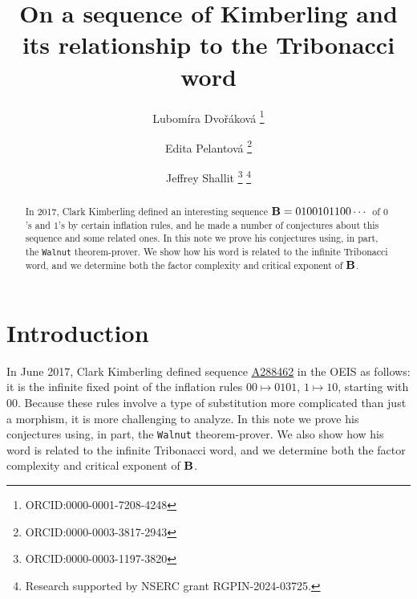 \documentclass[
final
]{dmtcs-episciences}
\author[Lubomíra Dvořáková et al.]{Lubomíra Dvořáková \thanks{ORCID:0000-0001-7208-4248} \affiliationmark{1}
  \and Edita Pelantová \thanks{ORCID:0000-0003-3817-2943} \affiliationmark{1}
  \and Jeffrey Shallit \thanks{ORCID:0000-0003-1197-3820} \affiliationmark{2}\thanks{Research supported by NSERC grant RGPIN-2024-03725.}}
\title[On a sequence of Kimberling]{On a sequence of Kimberling and its relationship to the Tribonacci word}
\affiliation{
  FNSPE, Czech Technical University, Prague, Czech Republic\\
  School of Computer Science, University of Waterloo, Waterloo, Canada  }
\newcommand{\seqnum}[1]{\href{https://oeis.org/#1}{\rm \underline{#1}}}
\theoremstyle{plain}
\theoremstyle{definition}
\theoremstyle{remark}
\begin{document}
\maketitle

\begin{abstract} In 2017, Clark Kimberling defined an interesting  sequence ${\bf B} = 0100101100 \cdots$ of $0$'s and $1$'s by
certain inflation rules, and he made a number of conjectures about this
sequence and some related ones.  In this note we prove his conjectures
using, in part, the {\tt Walnut} theorem-prover.  We show how his word
is related to the infinite Tribonacci word, and we determine both the factor complexity and critical exponent of  $\bf B$.
\end{abstract}



\section{Introduction}
In June 2017, Clark Kimberling defined sequence \seqnum{A288462} in the 
OEIS \cite{oeis} as follows:  it is the infinite fixed point of the inflation
rules $00 \mapsto 0101$,
$1 \mapsto 10$, starting with $00$. 
Because these rules involve
a type of substitution more complicated than just a morphism, it is more
challenging to analyze.  In this note we prove his conjectures
using, in part, the {\tt Walnut} theorem-prover.  We also show how his word
is related to the infinite Tribonacci word, and we determine both the factor complexity and critical exponent of $\bf B$.
\end{document}
